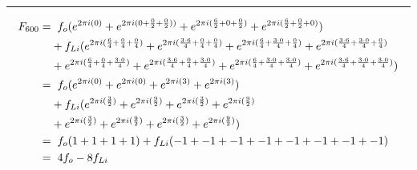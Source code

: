 \documentclass{article}
\begin{document}
\noindent\rule{12cm}{0.4pt}
\begin{align*}
	F_{600} =& \hspace{0.2cm}  f_{o}  (e^{2 \pi i (0)} 
	+ e^{2 \pi i (0 + \frac{0}{2} + \frac{0}{2}))} 
	+ e^{2 \pi i (\frac{6}{2} + 0 + \frac{0}{2})} 
	+ e^{2 \pi i (\frac{6}{2} + \frac{0}{2} + 0)})  \\
	&+ f_{Li} (e^{2 \pi i (\frac{6}{4} + \frac{0}{4} + \frac{0}{4})}  
	+ e^{2 \pi i (\frac{3 \cdot 6}{4} + \frac{0}{4} + \frac{0}{4})} 
	+ e^{2 \pi i (\frac{6}{4} + \frac{3 \cdot 0}{4} + \frac{0}{4})} 
	+ e^{2 \pi i (\frac{3 \cdot 6}{4} + \frac{3 \cdot 0}{4} + \frac{0}{4})} \\
	&+ e^{2 \pi i (\frac{6}{4} + \frac{0}{4} + \frac{3 \cdot 0}{4})}
	+ e^{2 \pi i (\frac{3 \cdot 6}{4} + \frac{0}{4} + \frac{3 \cdot 0}{4})} 
	+ e^{2 \pi i (\frac{6}{4} + \frac{3 \cdot 0}{4} + \frac{3 \cdot 0}{4})} 
	+ e^{2 \pi i (\frac{3 \cdot 6}{4} + \frac{3 \cdot 0}{4} + \frac{3 \cdot 0}{4})}) \\  
	=& \hspace{0.2cm}  f_{o}  (e^{2 \pi i (0)} 
	+ e^{2 \pi i (0)} 
	+ e^{2 \pi i (3)} 
	+ e^{2 \pi i (3)})  \\
	&+ f_{Li} (e^{2 \pi i (\frac{3}{2})}  
	+ e^{2 \pi i (\frac{9}{2})} 
	+ e^{2 \pi i (\frac{3}{2})} 
	+ e^{2 \pi i (\frac{9}{2})} \\
	&+ e^{2 \pi i (\frac{3}{2})}
	+ e^{2 \pi i (\frac{9}{2})} 
	+ e^{2 \pi i (\frac{3}{2})} 
	+ e^{2 \pi i (\frac{9}{2})}) \\
	=& \hspace{0.2cm}  f_{o}  (1  + 1 + 1 + 1) + f_{Li}(-1 + -1 + -1 + -1 + -1 + -1 + -1 + -1) \\
	=& \hspace{0.2cm} 4f_{o}   - 8f_{Li}
\end{align*}
\end{document}
